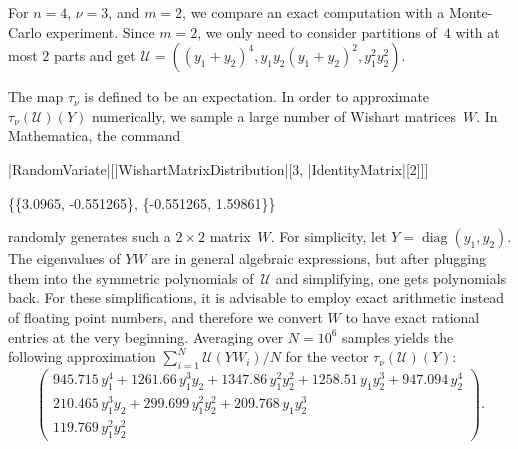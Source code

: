 \documentclass[smallextended]{svjour3}
\DeclareMathOperator{\diag}{diag}
\begin{document}
\begin{example}
  For $n=4$, $\nu=3$, and $m=2$, we compare an exact computation with a
  Monte-Carlo experiment.  Since $m=2$, we only need to consider partitions
  of~$4$ with at most $2$ parts and get $\mathcal{U}=\left((y_1+y_2)^4,
  y_1y_2(y_1+y_2)^2, y_1^2y_2^2\right)$. 

  The map $\tau_\nu$ is defined to be an expectation. In order to approximate
  $\tau_\nu(\mathcal{U})(Y)$ numerically, we sample a large number of Wishart
  matrices~$W$. In Mathematica, the command
  \begin{mma}
    \In |RandomVariate|[|WishartMatrixDistribution|[3, |IdentityMatrix|[2]]] \\
    \Out \rule{0pt}{8pt}\{\{3.0965, -0.551265\}, \{-0.551265, 1.59861\}\} \\
  \end{mma}
  \noindent
  randomly generates such a $2\times2$ matrix~$W$. For simplicity, let
  $Y=\diag(y_1,y_2)$. The eigenvalues of $YW$ are in general algebraic
  expressions, but after plugging them into the symmetric polynomials
  of~$\mathcal{U}$ and simplifying, one gets polynomials back. For these
  simplifications, it is advisable to employ exact arithmetic instead of
  floating point numbers, and therefore we convert $W$ to have exact rational
  entries at the very beginning. Averaging over $N=10^6$ samples yields the
  following approximation $\sum_{i=1}^N \mathcal{U}(YW_i)/N$ for the vector
  $\tau_\nu(\mathcal{U})(Y)$:
  \[
    \begin{pmatrix}
      945.715\,y_1^4 + 1261.66\,y_1^3y_2 + 1347.86\,y_1^2y_2^2 + 1258.51\,y_1y_2^3 + 947.094\,y_2^4 \\
      210.465\,y_1^3y_2 + 299.699\,y_1^2y_2^2 + 209.768\,y_1y_2^3 \\
      119.769\,y_1^2 y_2^2
    \end{pmatrix}.
  \]


\end{example}
\end{document}
